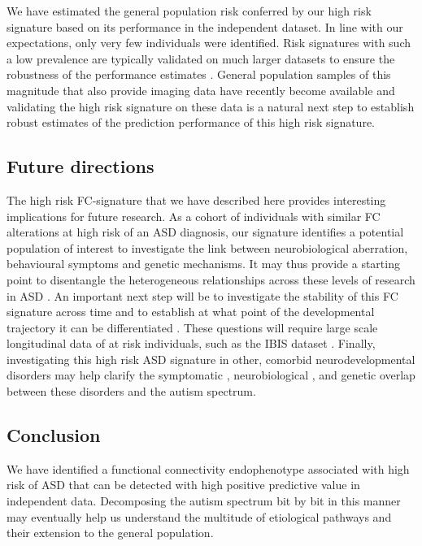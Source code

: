 \documentclass[9pt,lineno]{elife}
\begin{document}
We have estimated the general population risk conferred by our high risk signature based on its performance in the independent dataset. In line with our expectations, only very few individuals were identified. Risk signatures with such a low prevalence are typically validated on much larger datasets to ensure the robustness of the performance estimates \citep{Khera2018-of}. General population samples of this magnitude that also provide imaging data have recently become available \citep{Bycroft2018-se} and validating the high risk signature on these data is a natural next step to establish robust estimates of the prediction performance of this high risk signature.

\subsection{Future directions}
The high risk FC-signature that we have described here provides interesting implications for future research. As a cohort of individuals with similar FC alterations at high risk of an ASD diagnosis, our signature identifies a potential population of interest to investigate the link between neurobiological aberration, behavioural symptoms and genetic mechanisms. It may thus provide a starting point to disentangle the heterogeneous relationships across these levels of research in ASD \citep{Lombardo2019-mf}. An important next step will be to investigate the stability of this FC signature across time \citep{Jacob2019-zf} and to establish at what point of the developmental trajectory it can be differentiated \citep{Emerson2017-ne}. These questions will require large scale longitudinal data of at risk individuals, such as the IBIS dataset \citep{Wolff2012-vq}. Finally, investigating this high risk ASD signature in other, comorbid \citep{Simonoff2008-fr} neurodevelopmental disorders may help clarify the symptomatic \citep{Grzadzinski2011-rt}, neurobiological \citep{Van_den_Heuvel2019-ft,De_Lange2019-yy}, and genetic \citep{Cross-Disorder_Group_of_the_Psychiatric_Genomics_Consortium2013-au} overlap between these disorders and the autism spectrum.

\subsection{Conclusion}
We have identified a functional connectivity endophenotype associated with high risk of ASD that can be detected with high positive predictive value in independent data. Decomposing the autism spectrum bit by bit in this manner may eventually help us understand the multitude of etiological pathways and their extension to the general population.
\end{document}
